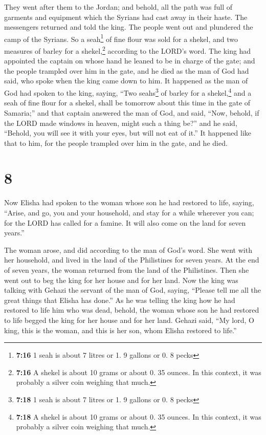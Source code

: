  They went after them to the Jordan; and behold, all the
path was full of garments and equipment which the Syrians had cast away
in their haste. The messengers returned and told the king.
 The people went out and plundered the camp of the
Syrians. So a seah\footnote{\textbf{7:16} 1 seah is about 7 litres or 1.
  9 gallons or 0. 8 pecks} of fine flour was sold for a shekel, and two
measures of barley for a shekel,\footnote{\textbf{7:16} A shekel is
  about 10 grams or about 0. 35 ounces. In this context, it was probably
  a silver coin weighing that much.} according to the LORD's word.
 The king had appointed the captain on whose hand he
leaned to be in charge of the gate; and the people trampled over him in
the gate, and he died as the man of God had said, who spoke when the
king came down to him.  It happened as the man of God had
spoken to the king, saying, ``Two seahs\footnote{\textbf{7:18} 1 seah is
  about 7 litres or 1. 9 gallons or 0. 8 pecks} of barley for a
shekel,\footnote{\textbf{7:18} A shekel is about 10 grams or about 0. 35
  ounces. In this context, it was probably a silver coin weighing that
  much.} and a seah of fine flour for a shekel, shall be tomorrow about
this time in the gate of Samaria;''  and that captain
answered the man of God, and said, ``Now, behold, if the LORD made
windows in heaven, might such a thing be?'' and he said, ``Behold, you
will see it with your eyes, but will not eat of it.''  It
happened like that to him, for the people trampled over him in the gate,
and he died.

\hypertarget{section-7}{%
\section{8}\label{section-7}}

 Now Elisha had spoken to the woman whose son he had
restored to life, saying, ``Arise, and go, you and your household, and
stay for a while wherever you can; for the LORD has called for a famine.
It will also come on the land for seven years.''

 The woman arose, and did according to the man of God's
word. She went with her household, and lived in the land of the
Philistines for seven years.  At the end of seven years,
the woman returned from the land of the Philistines. Then she went out
to beg the king for her house and for her land.  Now the
king was talking with Gehazi the servant of the man of God, saying,
``Please tell me all the great things that Elisha has done.''
 As he was telling the king how he had restored to life
him who was dead, behold, the woman whose son he had restored to life
begged the king for her house and for her land. Gehazi said, ``My lord,
O king, this is the woman, and this is her son, whom Elisha restored to
life.''

